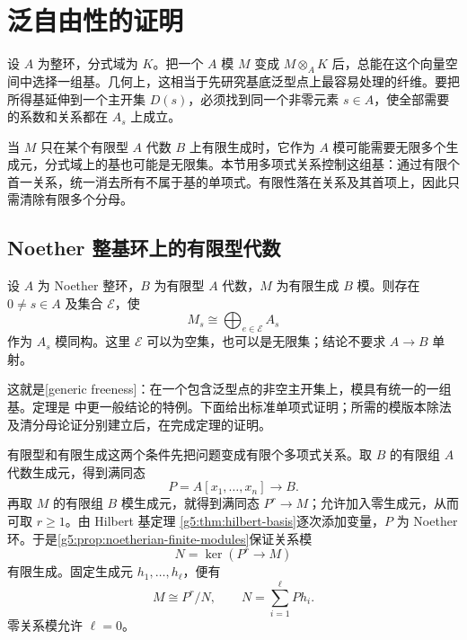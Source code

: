 
% 
% 

\section{泛自由性的证明}
\label{g5:sec:0603}

设 \(A\) 为整环，分式域为 \(K\)。把一个 \(A\) 模 \(M\) 变成 \(M\otimes_A K\) 后，总能在这个向量空间中选择一组基。几何上，这相当于先研究基底泛型点上最容易处理的纤维。要把所得基延伸到一个主开集 \(D(s)\)，必须找到同一个非零元素 \(s\in A\)，使全部需要的系数和关系都在 \(A_s\) 上成立。

\ProseParagraphBreak

当 \(M\) 只在某个有限型 \(A\) 代数 \(B\) 上有限生成时，它作为 \(A\) 模可能需要无限多个生成元，分式域上的基也可能是无限集。本节用多项式关系控制这组基：通过有限个首一关系，统一消去所有不属于基的单项式。有限性落在关系及其首项上，因此只需清除有限多个分母。

\subsection{Noether 整基环上的有限型代数}
\label{g5:subsec:0603:01}

\begin{theorem}[泛自由性]\label{g5:thm:generic-freeness}
	设 \(A\) 为 Noether 整环，\(B\) 为有限型 \(A\) 代数，\(M\) 为有限生成 \(B\) 模。则存在 \(0\ne s\in A\) 及集合 \(\mathcal E\)，使
	\[
		M_s\cong\bigoplus_{e\in\mathcal E}A_s
	\]
	作为 \(A_s\) 模同构。这里 \(\mathcal E\) 可以为空集，也可以是无限集；结论不要求 \(A\to B\) 单射。
\end{theorem}

这就是[generic freeness]：在一个包含泛型点的非空主开集上，模具有统一的一组基。定理是 \cite[第24节，定理24.1，第185—186页]{Matsumura1989}中更一般结论的特例。下面给出标准单项式证明；所需的模版本除法及清分母论证分别建立后，在完成定理的证明。

\ProseParagraphBreak

有限型和有限生成这两个条件先把问题变成有限个多项式关系。取 \(B\) 的有限组 \(A\) 代数生成元，得到满同态
\[
	P=A[x_1,\ldots,x_n]\longrightarrow B.
\]
再取 \(M\) 的有限组 \(B\) 模生成元，就得到满同态 \(P^r\to M\)；允许加入零生成元，从而可取 \(r\geq1\)。由 Hilbert 基定理 \cref{g5:thm:hilbert-basis}逐次添加变量，\(P\) 为 Noether 环。于是\cref{g5:prop:noetherian-finite-modules}保证关系模
\[
	N=\ker(P^r\longrightarrow M)
\]
有限生成。固定生成元 \(h_1,\ldots,h_\ell\)，便有
\begin{equation}\label{g5:eq:generic-free-presentation}
	M\cong P^r/N,
	\qquad
	N=\sum_{i=1}^{\ell}Ph_i.
\end{equation}
零关系模允许 \(\ell=0\)。

